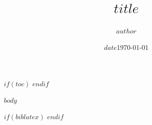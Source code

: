 \documentclass[11pt]{article}
\author{$author$}
\author{}
\title{$title$}
\title{}
\date{$date$}
\date{\today}
\begin{document}
\maketitle

$if(toc)$
\tableofcontents
\newpage
$endif$

\onehalfspacing

$body$

\newpage
$if(biblatex)$
\printbibliography
$endif$
\end{document}
